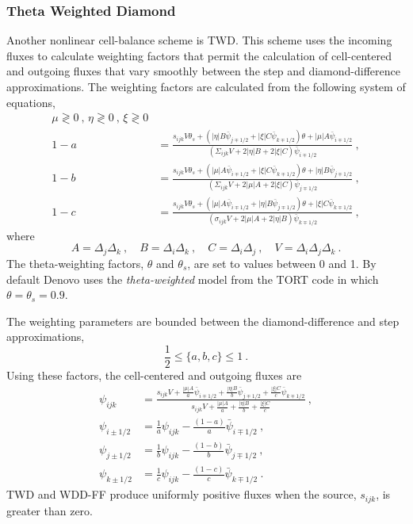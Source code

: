 \documentclass[12pt]{article}
\begin{document}
\subsubsection*{Theta Weighted Diamond}
Another nonlinear cell-balance scheme is TWD.  This scheme
uses the incoming fluxes to calculate weighting factors that permit the
calculation of cell-centered and outgoing fluxes that vary smoothly between
the step and diamond-difference approximations.  The weighting factors are
calculated from the following system of equations,
\begin{equation}
  \begin{aligned}
    \mu\gtrless0\:,\,\eta\gtrless0\:,\,\xi\gtrless0\\
    1-a &= \frac{s_{ijk}V\theta_s + (|\eta|B\bar{\psi}_{j\mp1/2} +
      |\xi|C\bar{\psi}_{k\mp1/2})\theta + |\mu|A\bar{\psi}_{i\mp1/2}}
    {(\Sigma_{ijk}V
      + 2|\eta|B + 2|\xi|C)\bar{\psi}_{i\mp1/2}}\:,\\
    1-b &= \frac{s_{ijk}V\theta_s + (|\mu|A\bar{\psi}_{i\mp1/2} +
      |\xi|C\bar{\psi}_{k\mp1/2})\theta + |\eta|B\bar{\psi}_{j\mp1/2}}
    {(\Sigma_{ijk}V
      + 2|\mu|A + 2|\xi|C)\bar{\psi}_{j\mp1/2}}\:,\\
    1-c &= \frac{s_{ijk}V\theta_s + (|\mu|A\bar{\psi}_{i\mp1/2} +
      |\eta|B\bar{\psi}_{j\mp1/2})\theta + |\xi|C\bar{\psi}_{k\mp1/2}}
    {(\sigma_{ijk}V + 2|\mu|A + 2|\eta|B)\bar{\psi}_{k\mp1/2}}\:,
  \end{aligned}
\end{equation}
where
\begin{equation}
  A = \Delta_j\Delta_k\:,\quad B = \Delta_i\Delta_k\:,\quad C =
  \Delta_i\Delta_j\:,\quad V = \Delta_i\Delta_j\Delta_k\:.
\end{equation}
The theta-weighting factors, $\theta$ and $\theta_s$, are set to values
between 0 and 1.  By default Denovo uses the \textit{theta-weighted} model
from the TORT code in which $\theta = \theta_s = 0.9$.

The weighting parameters are bounded between the diamond-difference and step
approximations,
\begin{equation}
  \frac{1}{2}\le\{a,b,c\}\le 1\:.
\end{equation}
Using these factors, the cell-centered and outgoing fluxes are
\begin{equation}
  \begin{aligned}
    \psi_{ijk} &= \frac{s_{ijk}V + \frac{|\mu|A}{a}\bar{\psi}_{i\mp1/2} +
      \frac{|\eta|B}{b}\bar{\psi}_{j\mp1/2} +
      \frac{|\xi|C}{c}\bar{\psi}_{k\mp1/2}}{s_{ijk}V + \frac{|\mu|A}{a} +
      \frac{|\eta|B}{b} + \frac{|\xi|C}{c}}\:,\\
    \psi_{i\pm1/2} &= \frac{1}{a}\psi_{ijk}-
    \frac{(1-a)}{a}\bar{\psi}_{i\mp1/2}\:,\\
    \psi_{j\pm1/2} &= \frac{1}{b}\psi_{ijk}-
    \frac{(1-b)}{b}\bar{\psi}_{j\mp1/2}\:,\\
    \psi_{k\pm1/2} &= \frac{1}{c}\psi_{ijk}-
    \frac{(1-c)}{c}\bar{\psi}_{k\mp1/2}\:.
  \end{aligned}
  \label{eq:twd}
\end{equation}
TWD and WDD-FF produce uniformly positive fluxes when the source, $s_{ijk}$,
is greater than zero.
\end{document}
